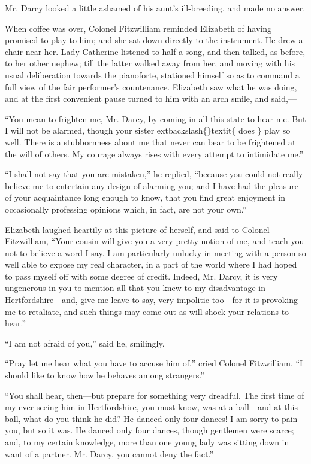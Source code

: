 \documentclass[10pt]{book}
\begin{document}
   Mr. Darcy looked a little ashamed of his aunt’s ill-breeding, and made
no answer.
  

   When coffee was over, Colonel Fitzwilliam reminded Elizabeth of having
promised to play to him; and she sat down directly to the instrument. He
drew a chair near her. Lady Catherine listened to half a song, and then
talked, as before, to her other nephew; till the latter walked away from
her, and moving with his usual deliberation towards the pianoforte,
stationed himself so
   as to command a full view of the fair performer’s
countenance. Elizabeth saw what he was doing, and at the first
convenient pause turned to him with an arch smile, and said,—
  

   “You mean to frighten me, Mr. Darcy, by coming in all this state to hear
me. But I will not be alarmed, though your sister
   	extbackslash\{\}textit\{
    does
   \}
   play so well.
There is a stubbornness about me that never can bear to be frightened at
the will of others. My courage always rises with every attempt to
intimidate me.”
  

   “I shall not say that you are mistaken,” he replied, “because you could
not really believe me to entertain any design of alarming you; and I
have had the pleasure of your acquaintance long enough to know, that you
find great enjoyment in occasionally professing opinions which, in fact,
are not your own.”
  

   Elizabeth laughed heartily at this picture of herself, and said to
Colonel Fitzwilliam, “Your cousin will give you a very pretty notion of
me, and teach you not to believe a word I say. I am particularly unlucky
in meeting with a person so well able to expose my real character, in a
part of the world where I had hoped to pass myself off with some degree
of credit. Indeed, Mr. Darcy, it is very ungenerous in you to mention
all that you knew to my disadvantage in Hertfordshire—and, give me
leave to say, very impolitic too—for it is provoking me to retaliate,
and such things may come out as will shock your relations to hear.”
  

   “I am not afraid of you,” said he, smilingly.
  

   “Pray let me hear what you have to accuse him of,” cried Colonel
Fitzwilliam. “I should like to know how he behaves among strangers.”
  

   “You shall hear, then—but prepare for something very
   dreadful. The
first time of my ever seeing him in Hertfordshire, you must know, was at
a ball—and at this ball, what do you think he did? He danced only four
dances! I am sorry to pain you, but so it was. He danced only four
dances, though gentlemen were scarce; and, to my certain knowledge, more
than one young lady was sitting down in want of a partner. Mr. Darcy,
you cannot deny the fact.”
  
\end{document}
